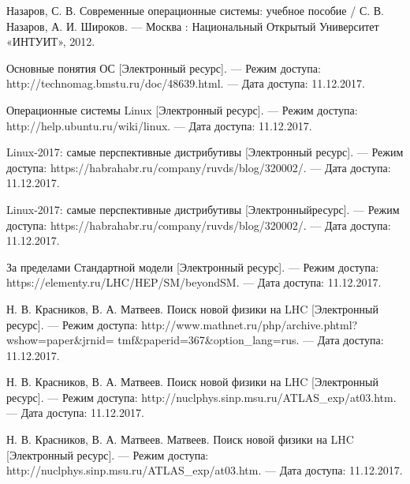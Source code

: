 

	Назаров, С. В. 
	Современные операционные системы: учебное пособие 
	/ С. В. Назаров, А. И. Широков. 
	— Москва : Национальный Открытый Университет «ИНТУИТ», 2012.

	Основные понятия ОС 
	[Электронный ресурс].
	 — Режим досту­па: http://technomag.bmstu.ru/doc/48639.html.
	 — Дата доступа: 11.12.2017.

	Операционные системы Linux 
	[Электронный ресурс].
	 — Ре­жим доступа: http://help.ubuntu.ru/wiki/linux.
	 — Дата доступа: 11.12.2017.
	 
	 Linux-2017: самые перспективные дистрибутивы  
	 [Электронный ресурс].
	 — Ре­жим доступа: https://habrahabr.ru/company/ruvds/blog/320002/.
	 — Дата доступа: 11.12.2017.

	Linux-2017: самые перспективные дистрибутивы 
	[Электронныйресурс].
	 — Режим доступа: https://habrahabr.ru/company/ruvds/blog/320002/.
	 — Дата доступа: 11.12.2017.

	За пределами Стандартной модели
	[Электронный ресурс].
	 — Режим доступа: https://elementy.ru/LHC/HEP/SM/beyondSM. 
	 — Да­та доступа: 11.12.2017.

	Н. В. Красников, В. А. Матвеев. 
	Поиск новой фи­зики на LHC 
	[Электронный ресурс].
	 — Режим доступа:
	http://www.mathnet.ru/php/archive.phtml?wshow=paper\&jrnid=
	tmf\&paperid=367\&option\_lang=rus.
	 — Дата доступа: 11.12.2017.


	Н. В. Красников, В. А. 
	Матвеев. Поиск новой физики на LHC
	[Электронный ресурс].
	 — Режим доступа: http://nuclphys.sinp.msu.ru/ATLAS\_exp/at03.htm. 
	 — Дата доступа: 11.12.2017.
	 
	Н. В. Красников, В. А. Матвеев. 
	Матвеев. Поиск новой физики на LHC
	[Электронный ресурс].
	— Режим доступа: http://nuclphys.sinp.msu.ru/ATLAS\_exp/at03.htm. 
	— Дата доступа: 11.12.2017.




